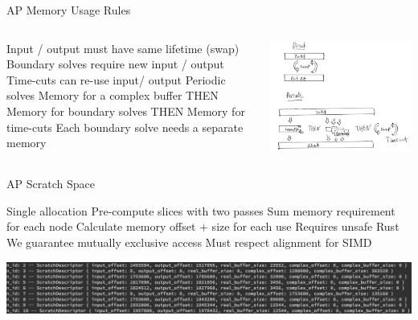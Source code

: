 \begin{frame}{AP Memory Usage Rules}
  \begin{columns}
  \begin{outline}
  \1 Input / output must have same lifetime (swap)
  \1 Boundary solves require new input / output 
  \1 Time-cuts can re-use input/ output 
  \1 Periodic solves
  \2 Memory for a complex buffer
  \2 THEN
  \2 Memory for boundary solves
  \2 THEN
  \2 Memory for time-cuts
  \1 Each boundary solve needs a separate memory
  \end{outline}

  \begin{center}
  \centering
  \includegraphics[width=\textwidth]{memory_usage.png}
  \end{center}
\end{columns}
\end{frame}

\begin{frame}{AP Scratch Space}
  \begin{outline}
  \1 Single allocation 
  \1 Pre-compute slices with two passes
  \2 Sum memory requirement for each node
  \2 Calculate memory offset + size for each use
  \1 Requires unsafe Rust
  \1 We guarantee mutually exclusive access
  \1 Must respect alignment for SIMD
  \end{outline}

\begin{center}
  \centering
  \includegraphics[width=\textwidth]{scratch_d.png}
\end{center}
\end{frame}

